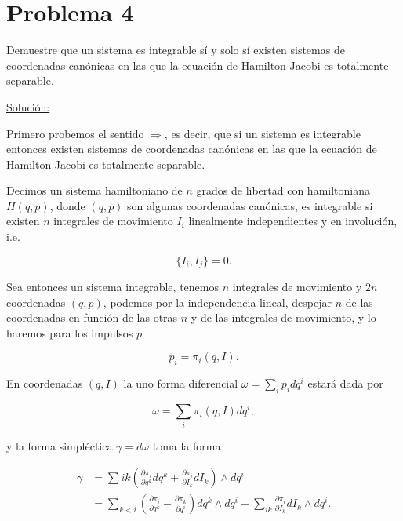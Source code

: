 \documentclass[a4paper,10pt]{article}
\numberwithin{equation}{section}
\begin{document}
\section{Problema 4}

Demuestre que un sistema es integrable sí y solo sí existen sistemas de coordenadas 
canónicas en las que la ecuación de Hamilton-Jacobi es totalmente separable.

\vspace{.3cm}

\underline{Solución:} \vspace{.3cm}

Primero probemos el sentido $\Rightarrow$, es decir, que si un sistema es integrable 
entonces existen sistemas de coordenadas canónicas en las que la ecuación de 
Hamilton-Jacobi es totalmente separable.

\vspace{.3cm}

Decimos un sistema hamiltoniano de $n$ grados de libertad con hamiltoniana 
$H(q,p)$, donde $(q,p)$ son algunas coordenadas canónicas, es integrable si 
existen $n$ integrales de movimiento $I_i$ linealmente independientes y
en involución, i.e.

\begin{equation}
 \{ I_i, I_j \} = 0.
\end{equation}

Sea entonces un sistema integrable, tenemos $n$ integrales de movimiento y $2n$ coordenadas 
$(q,p)$, podemos por la independencia lineal, despejar $n$ de las coordenadas en 
función de las otras $n$ y de las integrales de movimiento, y lo haremos para 
los impulsos $p$ 

\begin{equation}
 p_i = \pi_i(q,I).
\end{equation}

En coordenadas $(q,I)$ la uno forma diferencial $\omega = \sum_i p_i dq^i$ estará 
dada por 

\begin{equation}
 \omega = \sum_i \pi_i(q,I)dq^i,
\end{equation}

y la forma simpléctica $\gamma = d\omega$ toma la forma 

\begin{align*}
 \gamma &= \sum{ik} \left(\frac{\partial \pi_i}{\partial q^k}dq^k + 
 \frac{\partial \pi_i}{\partial I_k}dI_k\right) \wedge dq^i \\
  &= \sum_{k<i} \left(\frac{\partial \pi_i}{\partial q^k} - 
 \frac{\partial \pi_k}{\partial q^i}\right) dq^k \wedge dq^i + 
 \sum_{ik} \frac{\partial \pi_i}{\partial I_k} dI_k \wedge dq^i.
\end{align*}
\end{document}
